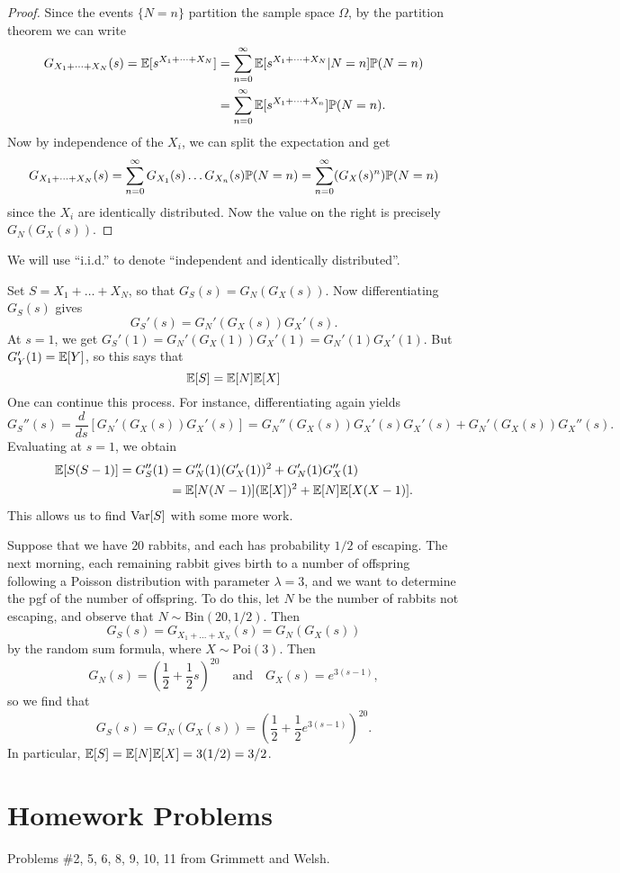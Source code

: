 \begin{proof}
  Since the events $\{N = n\}$ partition
  the sample space $\Omega$,
  by the partition theorem we can write
  \begin{align*}
    G_{X_1 + \dots + X_N}(s)
    = \mathbb{E}[s^{X_1 + \dots + X_N}]
    &= \sum_{n = 0}^\infty \mathbb{E}[s^{X_1 + \dots + X_N} | N = n] \mathbb{P}(N = n) \\
    &= \sum_{n = 0}^\infty \mathbb{E}[s^{X_1 + \dots + X_n}] \mathbb{P}(N = n).
  \end{align*}
  Now by independence of the $X_i$, we can
  split the expectation and get
  \[
    G_{X_1 + \dots + X_N}(s)
    = \sum_{n = 0}^\infty G_{X_1}(s) \dots G_{X_n}(s) \mathbb{P}(N = n)
    = \sum_{n = 0}^\infty (G_X(s)^n) \mathbb{P}(N = n)
  \]
  since the $X_i$ are identically distributed.
  Now the value on the right is precisely
  $G_N(G_X(s))$.
\end{proof}

\begin{remark}
  We will use ``i.i.d.'' to denote
  ``independent and identically distributed''.
\end{remark}

\begin{remark}
  Set $S = X_1 + \dots + X_N$, so that
  $G_S(s) = G_N(G_X(s))$. Now differentiating
  $G_S(s)$ gives
  \[
    G_S'(s) = G_N'(G_X(s)) G_X'(s).
  \]
  At $s = 1$, we get
  $G_S'(1) = G_N'(G_X(1)) G_X'(1) = G_N'(1) G_X'(1)$.
  But $G_Y'(1) = \mathbb{E}[Y]$, so this says that
  \[
    \mathbb{E}[S] = \mathbb{E}[N] \mathbb{E}[X]
  \]
  One can continue this process. For instance,
  differentiating again yields
  \[
    G_S''(s)
    = \frac{d}{ds} \left[G_N'(G_X(s)) G_X'(s)\right]
    = G_N''(G_X(s)) G_X'(s) G_X'(s) + G_N'(G_X(s)) G_X''(s).
  \]
  Evaluating at $s = 1$, we obtain
  \begin{align*}
    \mathbb{E}[S(S - 1)]
    = G_S''(1)
    &= G_N''(1) (G_X'(1))^2 + G_N'(1) G_X''(1) \\
    &= \mathbb{E}[N(N - 1)] (\mathbb{E}[X])^2 + \mathbb{E}[N] \mathbb{E}[X(X - 1)].
  \end{align*}
  This allows us to find $\operatorname{Var}[S]$ with some more
  work.
\end{remark}

\begin{example}
  Suppose that we have $20$ rabbits, and each
  has probability $1 / 2$ of escaping. The next
  morning, each remaining rabbit gives birth
  to a number of offspring following a Poisson
  distribution with parameter $\lambda = 3$,
  and we want to determine the pgf of the number
  of offspring. To do this, let $N$ be the number
  of rabbits not escaping, and observe that
  $N \sim \mathrm{Bin}(20, 1 / 2)$. Then
  \[
    G_S(s) = G_{X_1 + \dots + X_N}(s)
    = G_N(G_X(s))
  \]
  by the random sum formula, where
  $X \sim \mathrm{Poi}(3)$. Then
  \[
    G_N(s) = \left(\frac{1}{2} + \frac{1}{2}s\right)^{20} \quad \text{and} \quad
    G_X(s) = e^{3(s - 1)},
  \]
  so we find that
  \[
    G_S(s) = G_N(G_X(s))
    = \left(\frac{1}{2} + \frac{1}{2} e^{3(s - 1)}\right)^{20}.
  \]
  In particular, $\mathbb{E}[S] = \mathbb{E}[N] \mathbb{E}[X] = 3(1 / 2) = 3 / 2$.
\end{example}

\section{Homework Problems}
Problems \#2, 5, 6, 8, 9, 10, 11 from Grimmett and
Welsh.
